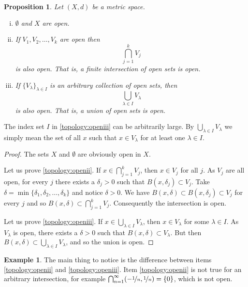 \documentclass[12pt,openany]{book}
\theoremstyle{plain}
\newtheorem{prop}[thm]{Proposition}
\theoremstyle{remark}
\theoremstyle{definition}
\theoremstyle{exercise}
\theoremstyle{example}
\newtheorem{example}[thm]{Example}
\begin{document}
\begin{prop} \label{prop:topology:open}
Let $(X,d)$ be a metric space.
\begin{enumerate}[(i)]
\item \label{topology:openi} $\emptyset$ and $X$ are open.
\item \label{topology:openii} If $V_1, V_2, \ldots, V_k$ are open then
\begin{equation*}
\bigcap_{j=1}^k V_j
\end{equation*}
is also open.  That is, a finite intersection of open sets is open.
\item \label{topology:openiii} If $\{ V_\lambda \}_{\lambda \in I}$ is
an arbitrary collection of open sets, then
\begin{equation*}
\bigcup_{\lambda \in I} V_\lambda
\end{equation*}
is also open.  That is, a union of open sets is open.
\end{enumerate}
\end{prop}

The index set $I$ in \ref{topology:openiii} can be arbitrarily large.
By $\bigcup_{\lambda \in I} V_\lambda$ we simply mean the set of
all $x$ such that $x \in V_\lambda$ for at least one $\lambda \in I$.

\begin{proof}
The sets $X$ and $\emptyset$ are obviously open in $X$.

Let us prove \ref{topology:openii}.
If $x \in \bigcap_{j=1}^k V_j$, then $x \in V_j$ for all $j$.
As $V_j$ are all open, for every $j$ there exists a $\delta_j > 0$ 
such that $B(x,\delta_j) \subset V_j$.  Take $\delta = \min \{
\delta_1,\delta_2,\ldots,\delta_k \}$ and notice $\delta > 0$.  We have
$B(x,\delta) \subset B(x,\delta_j) \subset V_j$ for every $j$ and so
$B(x,\delta) \subset \bigcap_{j=1}^k V_j$.  Consequently the intersection is open.

Let us prove \ref{topology:openiii}.
If $x \in \bigcup_{\lambda \in I} V_\lambda$, then $x \in V_\lambda$ for some
$\lambda \in I$.
As $V_\lambda$ is open, there exists a $\delta > 0$
such that $B(x,\delta) \subset V_\lambda$.  But then
$B(x,\delta) \subset \bigcup_{\lambda \in I} V_\lambda$,
and so the union is open.
\end{proof}

\begin{example}
The main thing to notice is the difference between
items
\ref{topology:openii} and \ref{topology:openiii}.
Item \ref{topology:openii} is not true for an arbitrary intersection,
for example $\bigcap_{n=1}^\infty (-\nicefrac{1}{n},\nicefrac{1}{n}) = \{ 0
\}$, which is not open.
\end{example}
\end{document}

